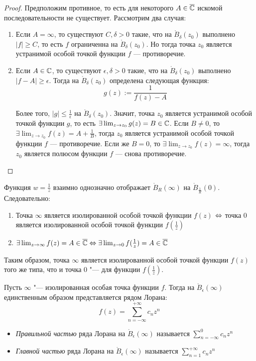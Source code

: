\begin{proof}
	Предположим противное, то есть для некоторого $A \in \overline{\mathbb{C}}$ искомой последовательности не существует. Рассмотрим два случая:
	\begin{enumerate}
		\item Если $A = \infty$, то существуют $C, \delta > 0$ такие, что на $\mathring B_\delta(z_0)$ выполнено $|f| \ge C$, то есть $f$ ограниченна на $\mathring B_\delta(z_0)$. Но тогда точка $z_0$ является устранимой особой точкой функции $f$ --- противоречие.
		
		\item Если $A \in \mathbb{C}$, то существуют $\epsilon, \delta > 0$ такие, что на $\mathring B_\delta(z_0)$ выполнено $|f - A| \ge \epsilon$. Тогда на $\mathring B_\delta(z_0)$ определена следующая функция:
		\[g(z) := \frac{1}{f(z) - A}\]
		
		Более того, $|g| \le \frac1\epsilon$ на $\mathring B_\delta(z_0)$. Значит, точка $z_0$ является устранимой особой точкой функции $g$, то есть $\exists \lim_{z \to z_0} g(z) = B \in \mathbb{C}$. Если $B \ne 0$, то $\exists \lim_{z \to z_0} f(z) = A + \frac1B$, тогда $z_0$ является устранимой особой точкой функции $f$ --- противоречие. Если же $B = 0$, то $\exists \lim_{z \to z_0} f(z) = \infty$, тогда $z_0$ является полюсом функции $f$ --- снова противоречие.\qedhere
	\end{enumerate}
\end{proof}

\begin{note}
	Функция $w = \frac1z$ взаимно однозначно отображает $\mathring B_R(\infty)$ на $\mathring B_{\frac1R}(0)$. Следовательно:
	\begin{enumerate}
		\item Точка $\infty$ является изолированной особой точкой функции $f(z)$ $\Leftrightarrow$ точка $0$ является изолированной особой точкой функции $f(\frac1z)$
		\item $\exists \lim_{z \to \infty}f(z) = A \in \overline{\mathbb{C}} \Leftrightarrow \exists \lim_{z \to 0}f(\frac1z) = A \in \overline{\mathbb{C}}$
	\end{enumerate}
	
	Таким образом, точка $\infty$ является изолированной особой точкой функции $f(z)$ того же типа, что и точка $0$ "--- для функции $f(\frac1z)$.
\end{note}

\begin{definition}
	Пусть $\infty$ "--- изолированная особая точка функции $f$. Тогда на $\mathring B_\epsilon(\infty)$ единственным образом представляется рядом Лорана:
	\[f(z) = \sum_{n = -\infty}^{+\infty}c_nz^n\]
	\begin{itemize}
		\item \textit{Правильной частью} ряда Лорана на $\mathring B_\epsilon(\infty)$ называется $\sum_{n = -\infty}^{0}c_nz^n$
		\item \textit{Главной частью} ряда Лорана на $\mathring B_\epsilon(\infty)$ называется $\sum_{n = 1}^{+\infty}c_nz^n$
	\end{itemize}
\end{definition}

